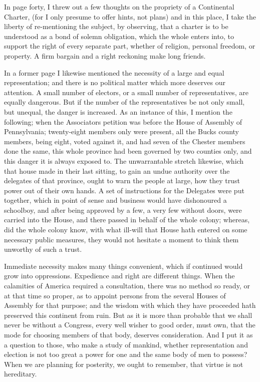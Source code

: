 \documentclass[12pt,oneside]{memoir}
\begin{document}
In page forty, I threw out a few thoughts on the propriety of a Continental Charter, (for I only presume to offer hints, not plans) and in this place, I take the liberty of re-mentioning the subject, by observing, that a charter is to be understood as a bond of solemn obligation, which the whole enters into, to support the right of every separate part, whether of religion, personal freedom, or property. A firm bargain and a right reckoning make long friends.

In a former page I likewise mentioned the necessity of a large and equal representation; and there is no political matter which more deserves our attention. A small number of electors, or a small number of representatives, are equally dangerous. But if the number of the representatives be not only small, but unequal, the danger is increased. As an instance of this, I mention the following; when the Associators petition was before the House of Assembly of Pennsylvania; twenty-eight members only were present, all the Bucks county members, being eight, voted against it, and had seven of the Chester members done the same, this whole province had been governed by two counties only, and this danger it is always exposed to. The unwarrantable stretch likewise, which that house made in their last sitting, to gain an undue authority over the delegates of that province, ought to warn the people at large, how they trust power out of their own hands. A set of instructions for the Delegates were put together, which in point of sense and business would have dishonoured a schoolboy, and after being approved by a few, a very few without doors, were carried into the House, and there passed in behalf of the whole colony; whereas, did the whole colony know, with what ill-will that House hath entered on some necessary public measures, they would not hesitate a moment to think them unworthy of such a trust.

Immediate necessity makes many things convenient, which if continued would grow into oppressions. Expedience and right are different things. When the calamities of America required a consultation, there was no method so ready, or at that time so proper, as to appoint persons from the several Houses of Assembly for that purpose; and the wisdom with which they have proceeded hath preserved this continent from ruin. But as it is more than probable that we shall never be without a Congress, every well wisher to good order, must own, that the mode for choosing members of that body, deserves consideration. And I put it as a question to those, who make a study of mankind, whether representation and election is not too great a power for one and the same body of men to possess? When we are planning for posterity, we ought to remember, that virtue is not hereditary.
\end{document}

